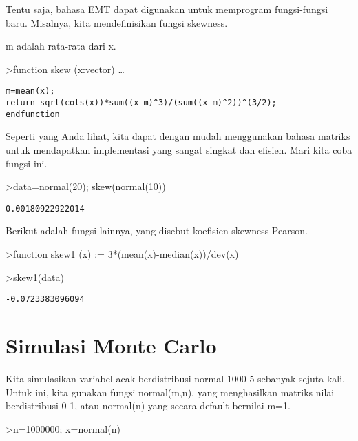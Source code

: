\documentclass[
]{book}
\begin{document}
Tentu saja, bahasa EMT dapat digunakan untuk memprogram fungsi-fungsi baru. Misalnya, kita mendefinisikan fungsi skewness.

m adalah rata-rata dari x.

\textgreater function skew (x:vector) \ldots{}

\begin{verbatim}
m=mean(x);
return sqrt(cols(x))*sum((x-m)^3)/(sum((x-m)^2))^(3/2);
endfunction
\end{verbatim}

Seperti yang Anda lihat, kita dapat dengan mudah menggunakan bahasa matriks untuk mendapatkan implementasi yang sangat singkat dan efisien. Mari kita coba fungsi ini.

\textgreater data=normal(20); skew(normal(10))

\begin{verbatim}
0.00180922922014
\end{verbatim}

Berikut adalah fungsi lainnya, yang disebut koefisien skewness Pearson.

\textgreater function skew1 (x) := 3*(mean(x)-median(x))/dev(x)

\textgreater skew1(data)

\begin{verbatim}
-0.0723383096094
\end{verbatim}

\chapter{Simulasi Monte Carlo}\label{simulasi-monte-carlo}

Kita simulasikan variabel acak berdistribusi normal 1000-5 sebanyak sejuta kali. Untuk ini, kita gunakan fungsi normal(m,n), yang menghasilkan matriks nilai berdistribusi 0-1, atau normal(n) yang secara default bernilai m=1.

\textgreater n=1000000; x=normal(n)
\end{document}
